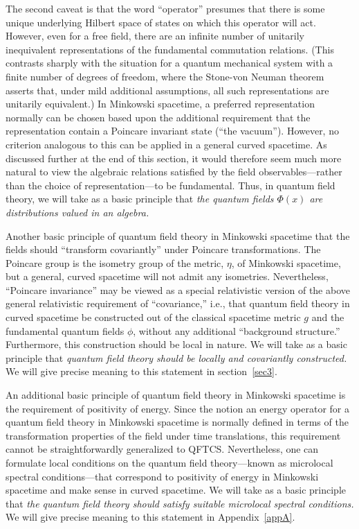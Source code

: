 \documentclass[12pt]{article}
\renewcommand{\O}{\Phi}
\theoremstyle{plain}
\theoremstyle{definition}
\begin{document}
The second caveat is that the word ``operator'' presumes that there is some unique underlying Hilbert space of states on which this operator will act. However, even for a free field, there are an infinite number of unitarily inequivalent representations of the fundamental commutation relations. (This contrasts sharply with the situation for a quantum mechanical system with a finite number of degrees of freedom, where the Stone-von Neuman theorem asserts that, under mild additional assumptions, all such representations are unitarily equivalent.) In Minkowski spacetime, a preferred representation normally can be chosen based upon the additional requirement that the representation contain a Poincare invariant state (``the vacuum''). However, no criterion analogous to this can be applied in a general curved spacetime. As discussed further at the end of this section, it would therefore seem much more natural to view the algebraic relations satisfied by the field observables---rather than the choice of representation---to be fundamental. Thus, in quantum field theory, we will take as a basic principle that {\em the quantum fields $\O(x)$ are distributions valued in an algebra.}

Another basic principle of quantum field theory in Minkowski spacetime that the fields should ``transform covariantly'' under Poincare transformations. The Poincare group is the isometry group of the metric, $\eta$, of Minkowski spacetime, but a general, curved spacetime will not admit any isometries. Nevertheless, ``Poincare invariance'' may be viewed as a special relativistic version of the above general relativistic requirement of ``covariance,'' i.e., that quantum field theory in curved spacetime be constructed out of the classical spacetime metric $g$ and the fundamental quantum fields $\phi$, without any additional ``background structure.'' Furthermore, this construction should be local in nature. We will take as a basic principle that {\em quantum field theory should be locally and covariantly constructed.} We will give precise meaning to this statement in section~\ref{sec3}.

An additional basic principle of quantum field theory in Minkowski spacetime is the requirement of positivity of energy. Since the notion an energy operator for a quantum field theory in Minkowski spacetime is normally defined in terms of the transformation properties of the field under time translations, this requirement cannot be straightforwardly generalized to QFTCS. Nevertheless, one can formulate local conditions on the quantum field theory---known as microlocal spectral conditions---that correspond to positivity of energy in Minkowski spacetime and make sense in curved spacetime. We will take as a basic principle that {\em the quantum field theory should satisfy suitable microlocal spectral conditions.} We will give precise meaning to this statement in Appendix~\ref{appA}.
\end{document}
